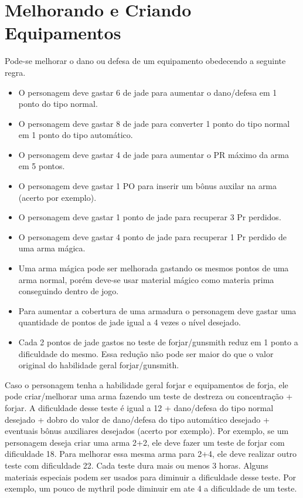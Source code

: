 \section{Melhorando e Criando Equipamentos}
Pode-se melhorar o dano ou defesa de um equipamento obedecendo a seguinte regra.

\begin{itemize}
	\item O personagem deve gastar 6 de jade para aumentar o dano/defesa em 1 ponto do tipo normal.
	\item O personagem deve gastar 8 de jade para converter 1 ponto do tipo normal em 1 ponto do tipo automático.
	\item O personagem deve gastar 4 de jade para aumentar o PR máximo da arma em 5 pontos.
	\item O personagem deve gastar 1 PO para inserir um bônus auxilar na arma (acerto por exemplo).
	\item O personagem deve gastar 1 ponto de jade para recuperar 3 Pr perdidos. %
	\item O personagem deve gastar 4 ponto de jade para recuperar 1 Pr perdido de uma arma mágica. %
	\item Uma arma mágica pode ser melhorada gastando os mesmos pontos de uma arma normal, porém deve-se usar material mágico como materia prima conseguindo dentro de jogo.
	\item Para aumentar a cobertura de uma armadura o personagem deve gastar uma quantidade de pontos de jade igual a 4 vezes o  nível desejado.
	\item Cada 2 pontos de jade gastos no teste de forjar/gunsmith reduz em 1 ponto a dificuldade do mesmo. Essa redução não pode ser maior do que o valor original do habilidade geral forjar/gunsmith.	
\end{itemize}

Caso o personagem tenha a habilidade geral forjar e equipamentos de forja, ele pode criar/melhorar uma arma fazendo um teste de destreza ou concentração + forjar. A dificuldade desse teste é igual a 12 + dano/defesa do tipo normal desejado + dobro do valor de dano/defesa do tipo automático desejado + eventuais bônus auxiliares desejados (acerto por exemplo). Por exemplo, se um personagem deseja criar uma arma 2+2, ele deve fazer um teste de forjar com dificuldade 18. Para melhorar essa mesma arma para 2+4, ele deve realizar outro teste com dificuldade 22. Cada teste dura mais ou menos 3 horas. Alguns materiais especiais podem ser usados para diminuir a dificuldade desse teste. Por exemplo, um pouco de mythril pode diminuir em ate 4 a dificuldade de um teste.

